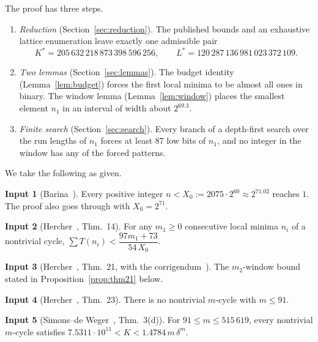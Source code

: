 \documentclass[11pt]{amsart}
\theoremstyle{definition}
\newtheorem{hypothesis}{Input}
\theoremstyle{remark}
\newcommand{\Kst}{K^{*}}
\newcommand{\Lst}{L^{*}}
\begin{document}
The proof has three steps.
\begin{enumerate}[label=\textbf{Step \arabic*.}, leftmargin=*]
  \item \emph{Reduction} (Section~\ref{sec:reduction}). The published bounds and an
  exhaustive lattice enumeration leave exactly one admissible pair
  \[
    \Kst = 205\,632\,218\,873\,398\,596\,256, \qquad
    \Lst = 120\,287\,136\,981\,023\,372\,109 .
  \]
  \item \emph{Two lemmas} (Section~\ref{sec:lemmas}). The budget identity (Lemma~\ref{lem:budget})
  forces the first local minima to be almost all ones in binary. The window lemma
  (Lemma~\ref{lem:window}) places the smallest element $n_1$ in an interval of width
  about $2^{69.3}$.
  \item \emph{Finite search} (Section~\ref{sec:search}). Every branch of a depth-first search
  over the run lengths of $n_1$ forces at least $87$ low bits of $n_1$, and no integer in
  the window has any of the forced patterns.
\end{enumerate}

We take the following as given.

\begin{hypothesis}[Barina~\cite{barina}]\label{in:x0}
Every positive integer $n < X_0 := 2075 \cdot 2^{60} \approx 2^{71.02}$ reaches $1$. The
proof also goes through with $X_0 = 2^{71}$.
\end{hypothesis}

\begin{hypothesis}[Hercher~\cite{hercher}, Thm.~14]\label{in:thm14}
For any $m_1 \ge 0$ consecutive local minima $n_i$ of a nontrivial cycle,
$\sum T(n_i) < \dfrac{97 m_1 + 73}{54\, X_0}$.
\end{hypothesis}

\begin{hypothesis}[Hercher~\cite{hercher}, Thm.~21, with the corrigendum~\cite{hercher-corr}]\label{in:thm21}
The $m_2$-window bound stated in Proposition~\ref{prop:thm21} below.
\end{hypothesis}

\begin{hypothesis}[Hercher~\cite{hercher}, Thm.~23]\label{in:hercher91}
There is no nontrivial $m$-cycle with $m \le 91$.
\end{hypothesis}

\begin{hypothesis}[Simons--de Weger~\cite{sdw}, Thm.~3(d)]\label{in:sdw}
For $91 \le m \le 515\,619$, every nontrivial $m$-cycle satisfies
$7.5311\cdot 10^{11} < K < 1.4784\, m\, \delta^{m}$.
\end{hypothesis}
\end{document}
